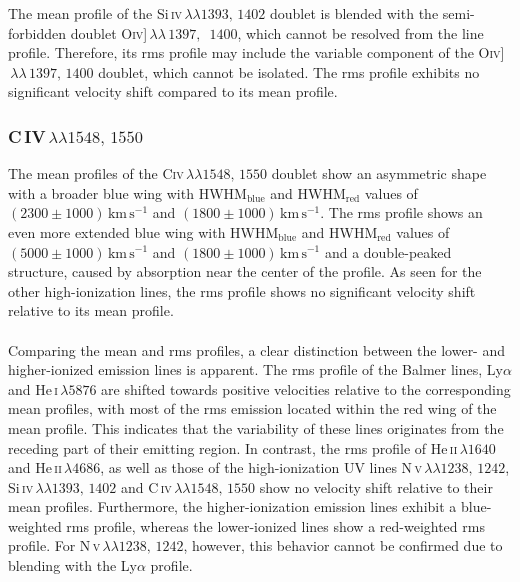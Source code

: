 The mean profile of the Si\,\textsc{iv}$\,\lambda\lambda 1393,\,1402$ doublet is blended with the semi-forbidden doublet O\textsc{iv}]$\,\lambda\lambda\,1397,\,$ $1400$, which cannot be resolved from the line profile. Therefore, its rms profile may include the variable component of the O\textsc{iv}]$\,\lambda\lambda\,1397,\,1400$ doublet, which cannot be isolated. The rms profile exhibits no significant velocity shift compared to its mean profile.


\subsubsection{C\,\textsc{IV}$\,\lambda\lambda 1548,\,1550$}

The mean profiles of the C\textsc{iv}$\,\lambda\lambda 1548,\,1550$ doublet show an asymmetric shape with a broader blue wing with HWHM$_\mathrm{blue}$ and HWHM$_\mathrm{red}$ values of $(2300\pm 1000)\,\mathrm{km\,s^{-1}}$ and $(1800 \pm 1000)\,\mathrm{km\,s^{-1}}$. The rms profile shows an even more extended  blue wing with HWHM$_\mathrm{blue}$ and HWHM$_\mathrm{red}$ values of $(5000\pm 1000)\,\mathrm{km\,s^{-1}}$ and $(1800 \pm 1000)\,\mathrm{km\,s^{-1}}$ and a double-peaked structure, caused by absorption near the center of the profile. As seen for the other high-ionization lines, the rms profile shows no significant velocity shift relative to its mean profile.  \\\\
Comparing the mean and rms profiles, a clear distinction between the lower- and higher-ionized emission lines is apparent. The rms profile of the Balmer lines, Ly$\alpha$ and He\,\textsc{i}$\,\lambda5876$ are shifted towards positive velocities relative to the corresponding mean profiles, with most of the rms emission located within the red wing of the mean profile. This indicates that the variability of these lines originates from the receding part of their emitting region. In contrast, the rms profile of He\,\textsc{ii}$\,\lambda1640$ and He\,\textsc{ii}$\,\lambda4686$, as well as those of the high-ionization UV lines N\,\textsc{v}$\,\lambda\lambda 1238,\,1242$, Si\,\textsc{iv}$\,\lambda\lambda 1393,\,1402$ and C\,\textsc{iv}$\,\lambda\lambda 1548,\,1550$ show no velocity shift relative to their mean profiles. Furthermore, the higher-ionization emission lines exhibit a blue-weighted rms profile, whereas the lower-ionized lines show a red-weighted rms profile. For N\,\textsc{v}$\,\lambda\lambda 1238,\,1242$, however, this behavior cannot be confirmed due to blending with the Ly$\alpha$ profile.\\\\
